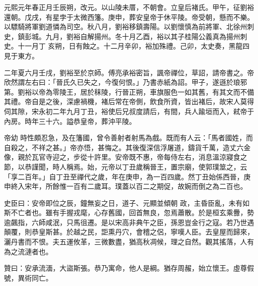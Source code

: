 \begin{pinyinscope}
 元熙元年春正月壬辰朔，改元。以山陵未厝，不朝會。立皇后褚氏。甲午，征劉裕還朝。戊戌，有星孛于太微西籓。庚申，葬安皇帝于休平陵。帝受朝，懸而不樂。以驃騎將軍劉道憐為司空。秋八月，劉裕移鎮壽陽。以劉懷慎為前將軍、北徐州刺史，鎮彭城。九月，劉裕自解揚州。冬十月乙酉，裕以其子桂陽公義真為揚州刺史。十一月丁
 亥朔，日有蝕之。十二月辛卯，裕加殊禮。己卯，太史奏，黑龍四見于東方。



 二年夏六月壬戌，劉裕至於京師。傅亮承裕密旨，諷帝禪位，草詔，請帝書之。帝欣然謂左右曰：「晉氏久已失之，今復何恨。」乃書赤紙為詔。甲子，遂遜於琅邪第。劉裕以帝為零陵王，居於秣陵，行晉正朔，車旗服色一如其舊，有其文而不備其禮。帝自是之後，深慮禍機，褚后常在帝側，飲食所資，皆出褚后，故宋人莫得伺其隙，宋永初二年九月丁丑，裕使后兄叔度請后，有間，兵人踰垣而入，弒帝于內房。時年三十六。謚恭皇帝，葬沖平陵。



 帝幼
 時性頗忍急，及在籓國，曾令善射者射馬為戲。既而有人云：「馬者國姓，而自殺之，不祥之甚。」帝亦悟，甚悔之。其後復深信浮屠道，鑄貨千萬，造丈六金像，親於瓦官寺迎之，步從十許里。安帝既不惠，帝每侍左右，消息溫涼寢食之節，以恭謹聞，時人稱焉。始，元帝以丁丑歲稱晉王，置宗廟，使郭璞筮之，云「享二百年。」自丁丑至禪代之歲，年在庚申，為一百四歲。然丁丑始係西晉，庚申終入宋年，所餘惟一百有二歲耳。璞蓋以百二之期促，故婉而倒之為二百也。



 史臣曰：安帝即位之辰，鐘無妄之日，道子、元顯並傾朝
 政，主昏臣亂，未有如斯不亡者也。雖有手握戎麾，心存舊國，回首無良，忽焉蕭散。於是桓玄乘釁，勢逾飆指，六師咸泯，只馬徂遷。是以宋高非典午之臣，孫恩豈金行之寇。若乃世遇顛覆，則恭皇斯甚。於越之民，詎熏丹穴，會稽之侶，寧嘆人臣。去皇屋而歸來，灑丹書而不恨。夫五運攸革，三微數盡，猶高秋凋候，理之自然。觀其搖落，人有為之流漣者也。



 贊曰：安承流湎，大盜斯張。恭乃寓命，他人是綱。猶存周赧，始立懷王。虛尊假號，異術同亡。



\end{pinyinscope}